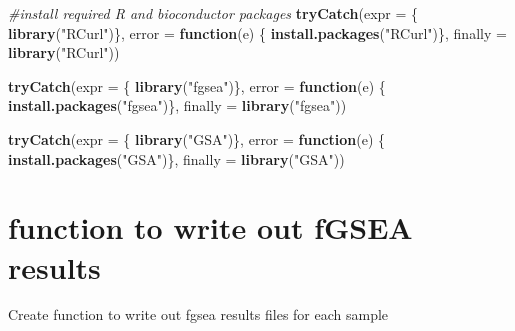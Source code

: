 \documentclass[
]{book}
\newenvironment{Shaded}{\begin{snugshade}}{\end{snugshade}}
\newcommand{\AttributeTok}[1]{\textcolor[rgb]{0.13,0.29,0.53}{#1}}
\newcommand{\CommentTok}[1]{\textcolor[rgb]{0.56,0.35,0.01}{\textit{#1}}}
\newcommand{\ControlFlowTok}[1]{\textcolor[rgb]{0.13,0.29,0.53}{\textbf{#1}}}
\newcommand{\FunctionTok}[1]{\textcolor[rgb]{0.13,0.29,0.53}{\textbf{#1}}}
\newcommand{\NormalTok}[1]{#1}
\newcommand{\StringTok}[1]{\textcolor[rgb]{0.31,0.60,0.02}{#1}}
\begin{document}
\begin{Shaded}
\begin{Highlighting}[]
\CommentTok{\#install required R and bioconductor packages}
\FunctionTok{tryCatch}\NormalTok{(}\AttributeTok{expr =}\NormalTok{ \{ }\FunctionTok{library}\NormalTok{(}\StringTok{"RCurl"}\NormalTok{)\}, }
         \AttributeTok{error =} \ControlFlowTok{function}\NormalTok{(e) \{  }
           \FunctionTok{install.packages}\NormalTok{(}\StringTok{"RCurl"}\NormalTok{)\}, }
         \AttributeTok{finally =} \FunctionTok{library}\NormalTok{(}\StringTok{"RCurl"}\NormalTok{))}

\FunctionTok{tryCatch}\NormalTok{(}\AttributeTok{expr =}\NormalTok{ \{ }\FunctionTok{library}\NormalTok{(}\StringTok{"fgsea"}\NormalTok{)\}, }
         \AttributeTok{error =} \ControlFlowTok{function}\NormalTok{(e) \{  }
           \FunctionTok{install.packages}\NormalTok{(}\StringTok{"fgsea"}\NormalTok{)\}, }
         \AttributeTok{finally =} \FunctionTok{library}\NormalTok{(}\StringTok{"fgsea"}\NormalTok{))}

\FunctionTok{tryCatch}\NormalTok{(}\AttributeTok{expr =}\NormalTok{ \{ }\FunctionTok{library}\NormalTok{(}\StringTok{"GSA"}\NormalTok{)\}, }
         \AttributeTok{error =} \ControlFlowTok{function}\NormalTok{(e) \{  }
           \FunctionTok{install.packages}\NormalTok{(}\StringTok{"GSA"}\NormalTok{)\}, }
         \AttributeTok{finally =} \FunctionTok{library}\NormalTok{(}\StringTok{"GSA"}\NormalTok{))}
\end{Highlighting}
\end{Shaded}

\section{function to write out fGSEA results}\label{function-to-write-out-fgsea-results}

Create function to write out fgsea results files for each sample
\end{document}
